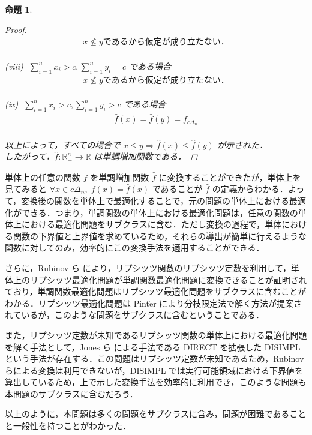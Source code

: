 \documentclass[a4paper,11pt]{jreport}
\newtheorem{proposition}{命題}
\begin{document}
\begin{proposition}
\begin{proof}
\begin{align*}
x \nleq y であるから仮定が成り立たない．
\end{align*}
\\
(viii) $ \; \sum_{i = 1}^{n} x_i > c, \sum_{i = 1}^{n} y_i = c $ である場合
\begin{align*}
x \nleq y であるから仮定が成り立たない．
\end{align*}
\\
(ix) $ \; \sum_{i = 1}^{n} x_i > c, \sum_{i = 1}^{n} y_i > c $ である場合
\begin{align*}
\hat{f}(x) = \hat{f}(y) = \overline{f}_{c \Delta_n}
\end{align*}
\\
以上によって，すべての場合で $ x \leq y \Rightarrow \hat{f}(x) \leq \hat{f}(y) $ が示された．\\
したがって，$ \hat{f} : \mathbb{R}_+^n \to \mathbb{R} $ は単調増加関数である．
\end{proof}
\end{proposition}

単体上の任意の関数 $ f $ を単調増加関数 $ \hat{f} $ に変換することができたが，単体上を見てみると $ \forall x \in c \Delta_n, \; f(x) = \hat{f}(x) $ であることが $ \hat{f} $ の定義からわかる．よって，変換後の関数を単体上で最適化することで，元の問題の単体上における最適化ができる．つまり，単調関数の単体上における最適化問題は，任意の関数の単体上における最適化問題をサブクラスに含む．ただし変換の過程で，単体における関数の下界値と上界値を求めているため，それらの導出が簡単に行えるような関数に対してのみ，効率的にこの変換手法を適用することができる．\par
さらに，Rubinov ら \cite{rubinov} により，リプシッツ関数のリプシッツ定数を利用して，単体上のリプシッツ最適化問題が単調関数最適化問題に変換できることが証明されており，単調関数最適化問題はリプシッツ最適化問題をサブクラスに含むことがわかる．リプシッツ最適化問題は Pint$\acute{\mbox{e}}$r \cite{pinter} により分枝限定法で解く方法が提案されているが，このような問題をサブクラスに含むということである．\par
また，リプシッツ定数が未知であるリプシッツ関数の単体上における最適化問題を解く手法として，Jones ら \cite{direct} による手法である DIRECT を拡張した DISIMPL \cite{disimpl} という手法が存在する．この問題はリプシッツ定数が未知であるため，Rubinov らによる変換は利用できないが，DISIMPL では実行可能領域における下界値を算出しているため，上で示した変換手法を効率的に利用でき，このような問題も本問題のサブクラスに含むだろう．\par
以上のように，本問題は多くの問題をサブクラスに含み，問題が困難であることと一般性を持つことがわかった．
\end{document}
